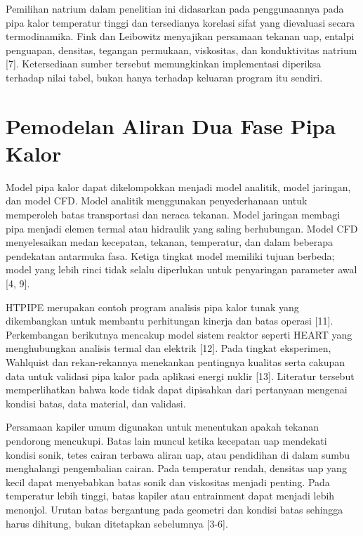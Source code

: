 \documentclass[
  12pt,
  12pt,a4paper,oneside]{report}
\begin{document}
Pemilihan natrium dalam penelitian ini didasarkan pada penggunaannya
pada pipa kalor temperatur tinggi dan tersedianya korelasi sifat yang
dievaluasi secara termodinamika. Fink dan Leibowitz menyajikan persamaan
tekanan uap, entalpi penguapan, densitas, tegangan permukaan,
viskositas, dan konduktivitas natrium {[}7{]}. Ketersediaan sumber
tersebut memungkinkan implementasi diperiksa terhadap nilai tabel, bukan
hanya terhadap keluaran program itu sendiri.

\hypertarget{pemodelan-aliran-dua-fase-pipa-kalor}{%
\section{Pemodelan Aliran Dua Fase Pipa
Kalor}\label{pemodelan-aliran-dua-fase-pipa-kalor}}

Model pipa kalor dapat dikelompokkan menjadi model analitik, model
jaringan, dan model CFD. Model analitik menggunakan penyederhanaan untuk
memperoleh batas transportasi dan neraca tekanan. Model jaringan membagi
pipa menjadi elemen termal atau hidraulik yang saling berhubungan. Model
CFD menyelesaikan medan kecepatan, tekanan, temperatur, dan dalam
beberapa pendekatan antarmuka fasa. Ketiga tingkat model memiliki tujuan
berbeda; model yang lebih rinci tidak selalu diperlukan untuk
penyaringan parameter awal {[}4, 9{]}.

HTPIPE merupakan contoh program analisis pipa kalor tunak yang
dikembangkan untuk membantu perhitungan kinerja dan batas operasi
{[}11{]}. Perkembangan berikutnya mencakup model sistem reaktor seperti
HEART yang menghubungkan analisis termal dan elektrik {[}12{]}. Pada
tingkat eksperimen, Wahlquist dan rekan-rekannya menekankan pentingnya
kualitas serta cakupan data untuk validasi pipa kalor pada aplikasi
energi nuklir {[}13{]}. Literatur tersebut memperlihatkan bahwa kode
tidak dapat dipisahkan dari pertanyaan mengenai kondisi batas, data
material, dan validasi.

Persamaan kapiler umum digunakan untuk menentukan apakah tekanan
pendorong mencukupi. Batas lain muncul ketika kecepatan uap mendekati
kondisi sonik, tetes cairan terbawa aliran uap, atau pendidihan di dalam
sumbu menghalangi pengembalian cairan. Pada temperatur rendah, densitas
uap yang kecil dapat menyebabkan batas sonik dan viskositas menjadi
penting. Pada temperatur lebih tinggi, batas kapiler atau entrainment
dapat menjadi lebih menonjol. Urutan batas bergantung pada geometri dan
kondisi batas sehingga harus dihitung, bukan ditetapkan sebelumnya
{[}3-6{]}.
\end{document}
